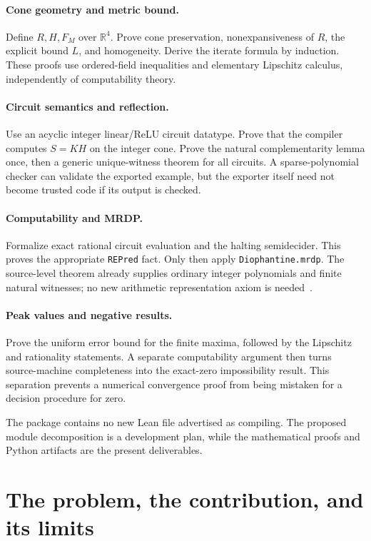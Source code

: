 \documentclass[11pt,letterpaper]{article}
\numberwithin{equation}{section}
\theoremstyle{definition}
\theoremstyle{remark}
\newcommand{\R}{\mathbb R}
\newcommand{\code}[1]{\nolinkurl{#1}}
\newcommand{\srcmark}[1]{\par\noindent{\small\itshape [source~#1]}\par}
\begin{document}
\paragraph{Cone geometry and metric bound.}
Define $R,H,F_M$ over $\R^4$. Prove cone preservation, nonexpansiveness of
$R$, the explicit bound $L$, and homogeneity. Derive the iterate formula by
induction. These proofs use ordered-field inequalities and elementary
Lipschitz calculus, independently of computability theory.

\paragraph{Circuit semantics and reflection.}
Use an acyclic integer linear/ReLU circuit datatype. Prove that the compiler
computes $S=K H$ on the integer cone. Prove the natural complementarity
lemma once, then a generic unique-witness theorem for all circuits.
A sparse-polynomial checker can validate the exported example, but the
exporter itself need not become trusted code if its output is checked.

\paragraph{Computability and MRDP.}
Formalize exact rational circuit evaluation and the halting semidecider.
This proves the appropriate \code{REPred} fact. Only then apply
\code{Diophantine.mrdp}. The source-level theorem already supplies ordinary
integer polynomials and finite natural witnesses; no new arithmetic
representation axiom is needed~\cite{b62s14-proveit-mrdp}.

\paragraph{Peak values and negative results.}
Prove the uniform error bound for the finite maxima, followed by the
Lipschitz and rationality statements. A separate computability argument
then turns source-machine completeness into the exact-zero impossibility
result. This separation prevents a numerical convergence proof from being
mistaken for a decision procedure for zero.

The package contains no new Lean file advertised as compiling. The proposed
module decomposition is a development plan, while the mathematical proofs
and Python artifacts are the present deliverables.

\section{The problem, the contribution, and its limits}\label{pqc:ad:sec:intro}
\srcmark{12}
\end{document}
